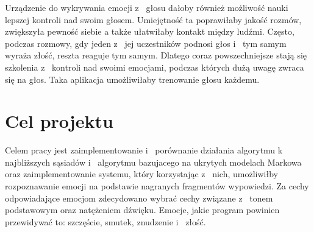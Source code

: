 \documentclass[declaration,shortabstract]{iithesis}
\begin{document}
Urządzenie do wykrywania emocji z~ głosu dałoby również możliwość nauki lepszej kontroli nad swoim głosem. Umiejętność ta poprawiłaby jakość rozmów, zwiększyła pewność siebie a także ułatwiłaby kontakt między ludźmi. Często, podczas rozmowy, gdy jeden z~ jej uczestników podnosi głos i~ tym samym wyraża złość, reszta reaguje tym samym. Dlatego coraz powszechniejsze stają się szkolenia z~ kontroli nad swoimi emocjami, podczas których dużą uwagę zwraca się na głos. Taka aplikacja umożliwiłaby trenowanie głosu każdemu. 

\section{Cel projektu}
Celem pracy jest zaimplementowanie i~ porównanie działania algorytmu k~ najbliższych sąsiadów i~ algorytmu bazujacego na ukrytych modelach Markowa oraz zaimplementowanie systemu, który korzystając z~ nich, umożliwiłby rozpoznawanie emocji na podstawie nagranych fragmentów wypowiedzi.
Za cechy odpowiadające emocjom zdecydowano wybrać cechy związane z~ tonem podstawowym oraz natężeniem dźwięku. Emocje, jakie program powinien przewidywać to: szczęście, smutek, znudzenie i~ złość.
\end{document}
